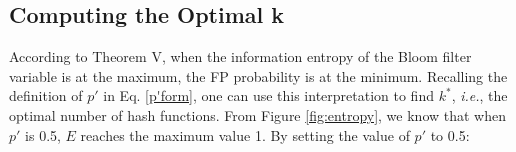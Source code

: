 %



%
%



\subsection{Computing the Optimal k}

According to Theorem V, when the information entropy of the Bloom filter variable is at the maximum, the FP probability is at the minimum. Recalling the definition of $p'$ in Eq. \ref{p'form}, one can use this interpretation to find $k^*$, \textit{i.e.}, the optimal number of hash functions. From Figure \ref{fig:entropy}, we know that when $p'$ is 0.5, $E$ reaches the maximum value 1. By setting  the value of $p'$ to 0.5:



